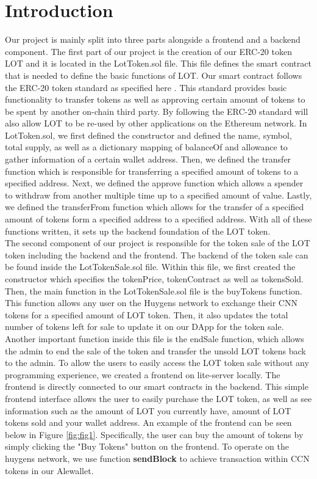 \documentclass[11pt]{article}
\newcommand {\rfig}[1]{Figure \ref{fig:#1}}
\begin{document}
\section*{Introduction}
Our project is mainly split into three parts alongside a frontend and a backend component. The first part of our project is the creation of our ERC-20 token LOT and it is located in the LotToken.sol file. This file defines the smart contract that is needed to define the basic functions of LOT. Our smart contract follows the ERC-20 token standard as specified here \parencite{EIP20}. This standard provides basic functionality to transfer tokens as well as approving certain amount of tokens to be spent by another on-chain third party. By following the ERC-20 standard will also allow LOT to be re-used by other applications on the Ethereum network. In LotToken.sol, we first defined the constructor and defined the name, symbol, total supply, as well as a dictionary mapping of balanceOf and allowance to gather information of a certain wallet address. Then, we defined the transfer function which is responsible for transferring a specified amount of tokens to a specified address. Next, we defined the approve function which allows a spender to withdraw from another multiple time up to a specified amount of value. Lastly, we defined the transferFrom function which allows for the transfer of a specified amount of tokens form a specified address to a specified address. With all of these functions written, it sets up the backend foundation of the LOT token.\parencite{Dapp} \\
The second component of our project is responsible for the token sale of the LOT token including the backend and the frontend. The backend of the token sale can be found inside the LotTokenSale.sol file. Within this file, we first created the constructor which specifies the tokenPrice, tokenContract as well as tokensSold. Then, the main function in the LotTokenSale.sol file is the buyTokens function. This function allows any user on the Huygens network \parencite{CCN} to exchange their CNN tokens for a specified amount of LOT token. Then, it also updates the total number of tokens left for sale to update it on our DApp for the token sale. Another important function inside this file is the endSale function, which allows the admin to end the sale of the token and transfer the unsold LOT tokens back to the admin. To allow the users to easily access the LOT token sale without any programming experience, we created a frontend on lite-server locally. The frontend is directly connected to our smart contracts in the backend. This simple frontend interface allows the user to easily purchase the LOT token, as well as see information such as the amount of LOT you currently have, amount of LOT tokens sold and your wallet address. An example of the frontend can be seen below in \rfig{fig1}. Specifically, the user can buy the amount of tokens by simply clicking the "Buy Tokens" button on the frontend. To operate on the huygens network, we use function \textbf{sendBlock} to achieve transaction within CCN tokens in our Alewallet. \\
\end{document}
